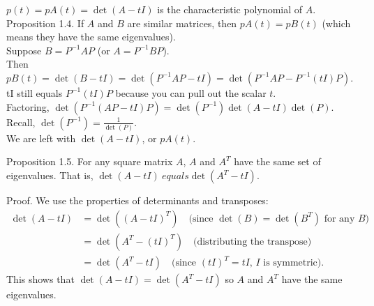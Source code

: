 \documentclass[12pt]{article}
\begin{document}
$p(t) = pA(t) = \det(A-t I)$ is the characteristic polynomial of $A$.\\


Proposition 1.4. If $A$ and $B$ are similar matrices, then $pA(t) = pB(t)$ (which means they have the same eigenvalues).\\
Suppose $B = P^{-1}AP$ (or $A = P^{-1}BP$).\\
Then $pB(t) = \det(B-tI) = \det(P^{-1}AP-tI) = \det(P^{-1}AP - P^{-1}(tI)P)$.\\
tI still equals $P^{-1}(tI)P$ because you can pull out the scalar $t$.\\ 
Factoring, $\det(P^{-1}(AP-tI)P) = \det(P^{-1}) \det(A-tI)\det(P)$.\\
Recall, $\det(P^{-1}) = \frac{1}{\det(P)}$.\\
We are left with $\det(A-tI)$, or $pA(t)$.

Proposition 1.5. For any square matrix \(A\), \(A\) and \(A^T\) have the same set of eigenvalues. That is, \( \det(A - tI) \ equals  \det(A^T - tI) \).

Proof. We use the properties of determinants and transposes:
\begin{align*}
\det(A - tI) &= \det((A - tI)^T) \quad \text{(since $\det(B) = \det(B^T)$ for any $B$)} \\
             &= \det(A^T - (tI)^T) \quad \text{(distributing the transpose)} \\
             &= \det(A^T - tI) \quad \text{(since $(tI)^T = tI$, $I$ is symmetric)}.
\end{align*}
This shows that \( \det(A - tI) = \det(A^T - tI) \) so \( A \) and \( A^T \) have the same eigenvalues.
\end{document}
